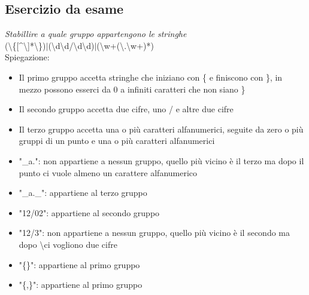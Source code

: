 \documentclass[12pt]{article}
\begin{document}
\subsection{Esercizio da esame}
\textit{Stabillire a quale gruppo appartengono le stringhe}\\
(\textbackslash \{[\textasciicircum\textbackslash]*\textbackslash\})$|$(\textbackslash d\textbackslash d/\textbackslash d\textbackslash d)$|$(\textbackslash w+(\textbackslash.\textbackslash w+)*)\\
Spiegazione:
\begin{itemize}
    \item Il primo gruppo accetta stringhe che iniziano con \{ e finiscono con \}, in mezzo possono esserci da 0 a infiniti caratteri che non siano \}
    \item Il secondo gruppo accetta due cifre, uno / e altre due cifre
    \item Il terzo gruppo accetta una o più caratteri alfanumerici, seguite da zero o più gruppi di un punto e una o più caratteri alfanumerici
\end{itemize}
\begin{itemize}
    \item "\_a.": non appartiene a nessun gruppo, quello più vicino è il terzo ma dopo il punto ci vuole almeno un carattere alfanumerico
    \item "\_a.\_": appartiene al terzo gruppo
    \item "12/02": appartiene al secondo gruppo
    \item "12/3": non appartiene a nessun gruppo, quello più vicino è il secondo ma dopo \textbackslash ci vogliono due cifre
    \item "\{\}": appartiene al primo gruppo
    \item "\{,\}": appartiene al primo gruppo
\end{itemize}
\end{document}
